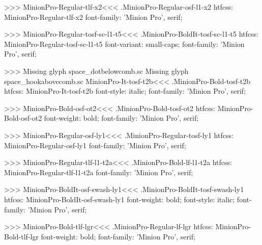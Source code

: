 {>>>
\<MinionPro-Regular-tlf-x2\><<<
.MinionPro-Regular-osf-l1-x2
htfcss:  MinionPro-Regular-tlf-x2  font-family: 'Minion Pro', serif;

>>>
\<MinionPro-Regular-tosf-sc-l1-t5\><<<
.MinionPro-BoldIt-tosf-sc-l1-t5
htfcss:  MinionPro-Regular-tosf-sc-l1-t5  font-variant: small-caps; font-family: 'Minion Pro', serif;

>>>
Missing glyph	space_dotbelowcomb.sc
Missing glyph	space_hookabovecomb.sc
\<MinionPro-It-tosf-t2b\><<<
.MinionPro-Bold-tosf-t2b
htfcss:  MinionPro-It-tosf-t2b  font-style: italic; font-family: 'Minion Pro', serif;

>>>
\<MinionPro-Bold-osf-ot2\><<<
.MinionPro-Bold-tosf-ot2
htfcss:  MinionPro-Bold-osf-ot2  font-weight: bold; font-family: 'Minion Pro', serif;

>>>
\<MinionPro-Regular-osf-ly1\><<<
.MinionPro-Regular-tosf-ly1
htfcss:  MinionPro-Regular-osf-ly1  font-family: 'Minion Pro', serif;

>>>
\<MinionPro-Regular-tlf-l1-t2a\><<<
.MinionPro-Bold-lf-l1-t2a
htfcss:  MinionPro-Regular-tlf-l1-t2a  font-family: 'Minion Pro', serif;

>>>
\<MinionPro-BoldIt-osf-swash-ly1\><<<
.MinionPro-BoldIt-tosf-swash-ly1
htfcss:  MinionPro-BoldIt-osf-swash-ly1  font-weight: bold; font-style: italic; font-family: 'Minion Pro', serif;

>>>
\<MinionPro-Bold-tlf-lgr\><<<
.MinionPro-Regular-lf-lgr
htfcss:  MinionPro-Bold-tlf-lgr  font-weight: bold; font-family: 'Minion Pro', serif;

}
